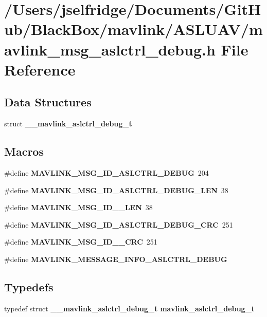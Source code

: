\section{/\+Users/jselfridge/\+Documents/\+Git\+Hub/\+Black\+Box/mavlink/\+A\+S\+L\+U\+A\+V/mavlink\+\_\+msg\+\_\+aslctrl\+\_\+debug.h File Reference}
\label{mavlink__msg__aslctrl__debug_8h}
\subsection*{Data Structures}
\begin{DoxyCompactItemize}
\item 
struct \textbf{ \+\_\+\+\_\+mavlink\+\_\+aslctrl\+\_\+debug\+\_\+t}
\end{DoxyCompactItemize}
\subsection*{Macros}
\begin{DoxyCompactItemize}
\item 
\#define \textbf{ M\+A\+V\+L\+I\+N\+K\+\_\+\+M\+S\+G\+\_\+\+I\+D\+\_\+\+A\+S\+L\+C\+T\+R\+L\+\_\+\+D\+E\+B\+UG}~204
\item 
\#define \textbf{ M\+A\+V\+L\+I\+N\+K\+\_\+\+M\+S\+G\+\_\+\+I\+D\+\_\+\+A\+S\+L\+C\+T\+R\+L\+\_\+\+D\+E\+B\+U\+G\+\_\+\+L\+EN}~38
\item 
\#define \textbf{ M\+A\+V\+L\+I\+N\+K\+\_\+\+M\+S\+G\+\_\+\+I\+D\+\_\+\_\+\+L\+EN}~38
\item 
\#define \textbf{ M\+A\+V\+L\+I\+N\+K\+\_\+\+M\+S\+G\+\_\+\+I\+D\+\_\+\+A\+S\+L\+C\+T\+R\+L\+\_\+\+D\+E\+B\+U\+G\+\_\+\+C\+RC}~251
\item 
\#define \textbf{ M\+A\+V\+L\+I\+N\+K\+\_\+\+M\+S\+G\+\_\+\+I\+D\+\_\+\_\+\+C\+RC}~251
\item 
\#define \textbf{ M\+A\+V\+L\+I\+N\+K\+\_\+\+M\+E\+S\+S\+A\+G\+E\+\_\+\+I\+N\+F\+O\+\_\+\+A\+S\+L\+C\+T\+R\+L\+\_\+\+D\+E\+B\+UG}
\end{DoxyCompactItemize}
\subsection*{Typedefs}
\begin{DoxyCompactItemize}
\item 
typedef struct \textbf{ \+\_\+\+\_\+mavlink\+\_\+aslctrl\+\_\+debug\+\_\+t} \textbf{ mavlink\+\_\+aslctrl\+\_\+debug\+\_\+t}
\end{DoxyCompactItemize}


